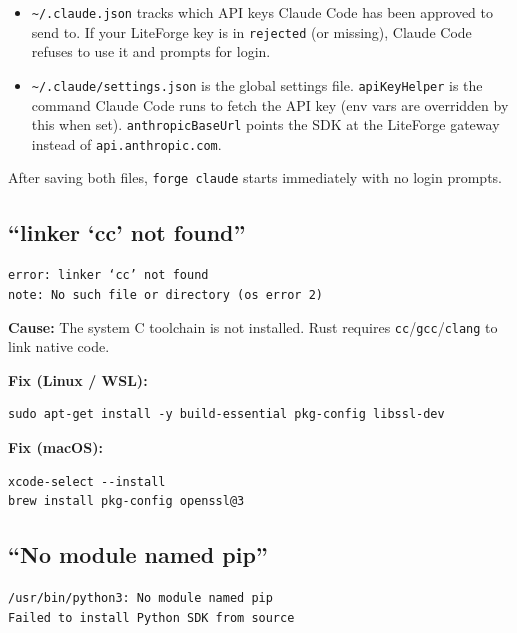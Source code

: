 \documentclass[11pt,letterpaper]{article}
\begin{document}
\begin{tcolorbox}[infobox={Why two files?}]
\begin{itemize}[nosep]
  \item \texttt{\textasciitilde/.claude.json} tracks which API keys
    Claude Code has been approved to send to. If your LiteForge key is in
    \texttt{rejected} (or missing), Claude Code refuses to use it and
    prompts for login.
  \item \texttt{\textasciitilde/.claude/settings.json} is the global
    settings file. \texttt{apiKeyHelper} is the command Claude Code runs
    to fetch the API key (env vars are overridden by this when set).
    \texttt{anthropicBaseUrl} points the SDK at the LiteForge gateway
    instead of \texttt{api.anthropic.com}.
\end{itemize}
After saving both files, \texttt{forge claude} starts immediately with no
login prompts.
\end{tcolorbox}

\subsection{``linker `cc' not found''}

\begin{tcolorbox}[warnbox={Error}]
\texttt{error: linker `cc' not found} \\
\texttt{note: No such file or directory (os error 2)}
\end{tcolorbox}

\textbf{Cause:} The system C toolchain is not installed. Rust requires
\texttt{cc}/\texttt{gcc}/\texttt{clang} to link native code.

\textbf{Fix (Linux / WSL):}
\begin{lstlisting}[style=bash]
sudo apt-get install -y build-essential pkg-config libssl-dev
\end{lstlisting}

\textbf{Fix (macOS):}
\begin{lstlisting}[style=bash]
xcode-select --install
brew install pkg-config openssl@3
\end{lstlisting}

\subsection{``No module named pip''}

\begin{tcolorbox}[warnbox={Error}]
\texttt{/usr/bin/python3: No module named pip} \\
\texttt{Failed to install Python SDK from source}
\end{tcolorbox}
\end{document}
